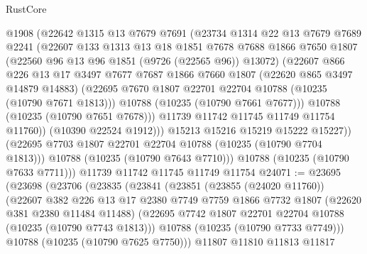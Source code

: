 \begin{lexlean}{RustCore}
\begin{coremodule}
                @1908
                (@22642
                  @1315
                  @13
                  @7679
                  @7691
                  (@23734
                    @1314
                    @22
                    @13
                    @7679
                    @7689
                    @2241
                    (@22607
                      @133
                      @1313
                      @13
                      @18
                      @1851
                      @7678
                      @7688
                      @1866
                      @7650
                      @1807
                      (@22560 @96 @13 @96 @1851 (@9726 (@22565 @96)) @13072)
                      (@22607
                        @866
                        @226
                        @13
                        @17
                        @3497
                        @7677
                        @7687
                        @1866
                        @7660
                        @1807
                        (@22620 @865 @3497 @14879 @14883)
                        (@22695 @7670 @1807 @22701 @22704 @10788 (@10235 (@10790 @7671 @1813)))
                        @10788
                        (@10235 (@10790 @7661 @7677)))
                      @10788
                      (@10235 (@10790 @7651 @7678)))
                    @11739
                    @11742
                    @11745
                    @11749
                    @11754
                    @11760))
                (@10390 @22524 @1912)))
            @15213
            @15216
            @15219
            @15222
            @15227))
        (@22695 @7703 @1807 @22701 @22704 @10788 (@10235 (@10790 @7704 @1813)))
        @10788
        (@10235 (@10790 @7643 @7710)))
      @10788
      (@10235 (@10790 @7633 @7711)))
    @11739
    @11742
    @11745
    @11749
    @11754
@24071 := @23695
    (@23698
      (@23706
        (@23835
          (@23841
            (@23851
              (@23855 (@24020 @11760))
              (@22607
                @382
                @226
                @13
                @17
                @2380
                @7749
                @7759
                @1866
                @7732
                @1807
                (@22620 @381 @2380 @11484 @11488)
                (@22695 @7742 @1807 @22701 @22704 @10788 (@10235 (@10790 @7743 @1813)))
                @10788
                (@10235 (@10790 @7733 @7749)))
              @10788
              (@10235 (@10790 @7625 @7750)))
            @11807
            @11810
            @11813
            @11817

\end{coremodule}
\end{lexlean}
